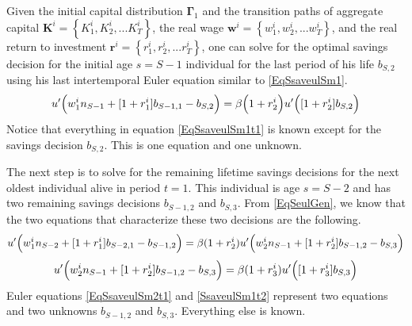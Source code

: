 \documentclass[letterpaper,12pt]{article}
\theoremstyle{definition}
\numberwithin{equation}{section}
\numberwithin{exercise}{section}
\begin{document}
\begin{spacing}{1.5}
      Given the initial capital distribution $\bm{\Gamma}_1$ and the transition paths of aggregate capital $\bm{K}^i = \left\{K_1^i,K_2^i,...K_T^i\right\}$, the real wage $\bm{w}^i = \left\{w_1^i,w_2^i,...w_T^i\right\}$, and the real return to investment $\bm{r}^i = \left\{r_1^i,r_2^i,...r_T^i\right\}$, one can solve for the optimal savings decision for the initial age $s=S-1$ individual for the last period of his life $b_{S,2}$ using his last intertemporal Euler equation similar to \eqref{EqSsaveulSm1}.
      \begin{equation}\label{EqSsaveulSm1t1}
         u'\Bigl(w_1^i n_{S-1} + [1 + r_1^i]b_{S-1,1} - b_{S,2}\Bigr) = \beta\Bigl(1 + r_2^i\Bigr)u'\Bigl([1 + r_2^i]b_{S,2}\Bigr)
      \end{equation}
      Notice that everything in equation \eqref{EqSsaveulSm1t1} is known except for the savings decision $b_{S,2}$. This is one equation and one unknown.

      The next step is to solve for the remaining lifetime savings decisions for the next oldest individual alive in period $t=1$. This individual is age $s=S-2$ and has two remaining savings decisions $b_{S-1,2}$ and $b_{S,3}$. From \eqref{EqSeulGen}, we know that the two equations that characterize these two decisions are the following.
      \begin{equation}\label{EqSsaveulSm2t1}
         u'\Bigl(w_1^i n_{S-2} + [1 + r_1^i]b_{S-2,1} - b_{S-1,2}\Bigr) = \beta(1 + r_2^i)u'\Bigl(w_2^i n_{S-1} + [1 + r_2^i]b_{S-1,2} - b_{S,3}\Bigr)
      \end{equation}
      \begin{equation}\label{SsaveulSm1t2}
         u'\Bigl(w_2^i n_{S-1} + [1 + r_2^i]b_{S-1,2} - b_{S,3}\Bigr) = \beta(1 + r_3^i)u'\Bigl([1 + r_3^i]b_{S,3}\Bigr)
      \end{equation}
      Euler equations \eqref{EqSsaveulSm2t1} and \eqref{SsaveulSm1t2} represent two equations and two unknowns $b_{S-1,2}$ and $b_{S,3}$. Everything else is known.


\end{spacing}
\end{document}
